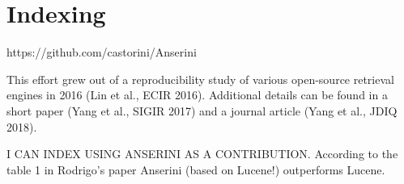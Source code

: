 \section{Indexing}
https://github.com/castorini/Anserini


 This effort grew out of a reproducibility study of various open-source retrieval engines in 2016 (Lin et al., ECIR 2016). Additional details can be found in a short paper (Yang et al., SIGIR 2017) and a journal article (Yang et al., JDIQ 2018).

I CAN INDEX USING ANSERINI AS A CONTRIBUTION. According to the table 1 in Rodrigo's paper Anserini (based on Lucene!) outperforms Lucene.

